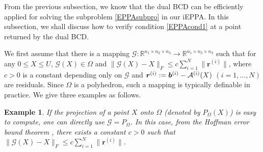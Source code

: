 \documentclass[10pt]{article}
\newcommand{\cA}{{\cal A}}
\newcommand{\R}{\mathbb R}
\newtheorem{example}{Example}
\begin{document}
From the previous subsection, we know that the dual BCD can be efficiently applied for solving the subproblem \eqref{EPPAsubpro} in our iEPPA. In this subsection, we shall discuss how to verify condition \eqref{EPPAcond1} at a point returned by the dual BCD.

We first assume that there is a mapping $\mathcal{G}:\R^{n_1\times n_2\times n_3}\rightarrow \R^{n_1\times n_2\times n_3}$ such that for any $0\leq X\leq U$, $\mathcal{G}(X)\in\Omega$ and $\|\mathcal{G}(X)-X\|_F \leq c\sum^N_{i=1}\|\bm{r}^{(i)}\|$, where $c>0$ is a constant  depending only on $\mathcal{G}$ and $\bm{r}^{(i)}:=\bm{b}^{(i)} - \cA^{(i)}(X)$ $(i = 1,\dots,N)$ are residuals. Since $\Omega$ is a polyhedron, such a mapping is typically definable in practice. We give three examples as follows.

\begin{example}
If the projection of a point $X$ onto $\Omega$ (denoted by $P_{\Omega}(X)$) is easy to compute, one can directly use $\mathcal{G}=P_{\Omega}$. In this case, from the Hoffman error bound theorem \cite{h1952on}, there exists a constant $c>0$ such that $\|\mathcal{G}(X)-X\|_F \leq c\sum^N_{i=1}\|\bm{r}^{(i)}\|$.
\end{example}
\end{document}
